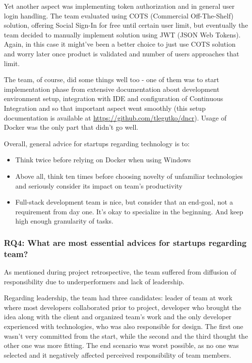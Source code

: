 \documentclass{article}
\begin{document}
Yet another aspect was implementing token authorization and in general user login handling. The team evaluated using COTS (Commercial Off-The-Shelf) solution, offering Social Sign-In for free until certain user limit, but eventually the team decided to manually implement solution using JWT (JSON Web Tokens). Again, in this case it might've been a better choice to just use COTS solution and worry later once product is validated and number of users approaches that limit.

The team, of course, did some things well too - one of them was to start implementation phase from extensive documentation about development environment setup, integration with IDE and configuration of Continuous Integration and so that important aspect went smoothly (this setup documentation is available at \url{https://github.com/tlegutko/dncr}). Usage of Docker was the only part that didn't go well.

Overall, general advice for startups regarding technology is to:
\begin{itemize}
\item Think twice before relying on Docker when using Windows
\item Above all, think ten times before choosing novelty of unfamiliar technologies and seriously consider its impact on team's productivity
\item Full-stack development team is nice, but consider that an end-goal, not a requirement from day one. It's okay to specialize in the beginning. And keep high enough granularity of tasks.
\end{itemize}

\subsubsection{RQ4: What are most essential advices for startups regarding team?}
As mentioned during project retrospective, the team suffered from diffusion of responsibility due to underperformers and lack of leadership.

Regarding leadership, the team had three candidates: leader of team at work where most developers collaborated prior to project, developer who brought the idea along with the client and organized team's work and the only developer experienced with technologies, who was also responsible for design. The first one wasn't very committed from the start, while the second and the third thought the other one was more fitting. The end scenario was worst possible, as no one was selected and it negatively affected perceived responsibility of team members.
\end{document}
